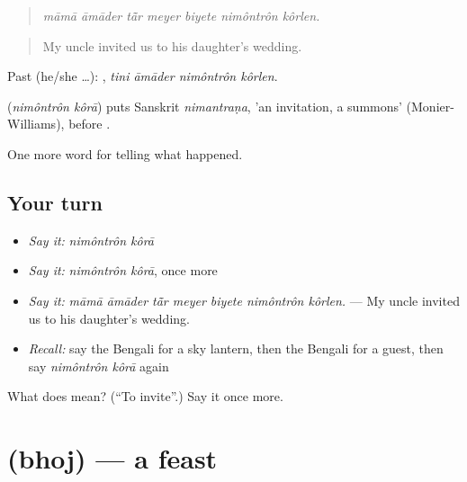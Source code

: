 \begin{quote}
\emph{māmā āmāder tā̃r meyer biyete nimôntrôn kôrlen.}
\end{quote}

\begin{quote}
My uncle invited us to his daughter's wedding.
\end{quote}

Past (he/she …):    , \emph{tini āmāder nimôntrôn kôrlen}.

\begin{cousinweb}
\textbf{ } (\emph{nimôntrôn kôrā}) puts Sanskrit \emph{nimantraṇa}, 'an invitation, a summons' (Monier-Williams), before .
\end{cousinweb}

\begin{grammarlens}[title={What you've built}]
One more word for telling what happened.
\end{grammarlens}

\subsection*{Your turn}
\begin{itemize}
\raggedright
  \item \emph{Say it:} \emph{nimôntrôn kôrā}
  \item \emph{Say it:} \emph{nimôntrôn kôrā}, once more
  \item \emph{Say it:} \emph{māmā āmāder tā̃r meyer biyete nimôntrôn kôrlen.} — My uncle invited us to his daughter's wedding.
  \item \emph{Recall:} say the Bengali for a sky lantern, then the Bengali for a guest, then say \emph{nimôntrôn kôrā} again
\end{itemize}

\begin{tcolorbox}[breakable,colback=teal!4,colframe=teal!35!black,title={Before you move on}]
What does   mean? (\textquotedblleft{}To invite\textquotedblright{}.) Say it once more.
\end{tcolorbox}
\section[\texorpdfstring{\bn{ভোজ} (bhoj)}{ভোজ (bhoj)}]{ (bhoj) — a feast}

\label{lesson:BN-C306-bhoj}



